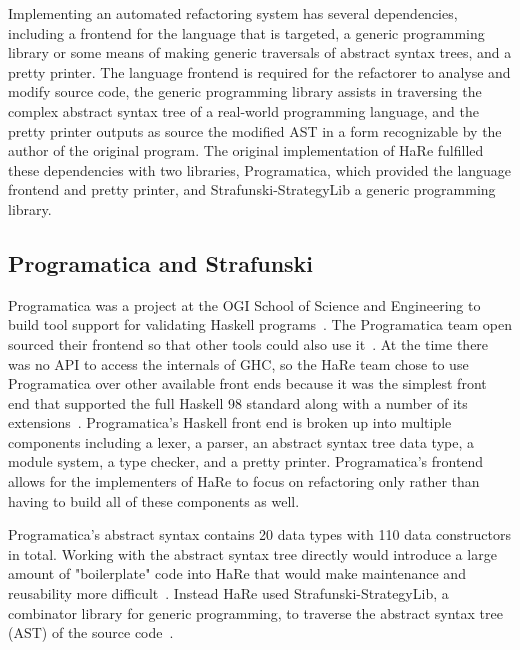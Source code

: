 Implementing an automated refactoring system has several dependencies, including a frontend for the language that is targeted, a generic programming library or some means of making generic traversals of abstract syntax trees, and a pretty printer. The language frontend is required for the refactorer to analyse and modify source code, the generic programming library assists in traversing the complex abstract syntax tree of a real-world programming language, and the pretty printer outputs as source the modified AST in a form recognizable by the author of the original program. The original implementation of HaRe fulfilled these dependencies with two libraries, Programatica, which provided the language frontend and pretty printer, and Strafunski-StrategyLib a generic programming library. 

\subsection{Programatica and Strafunski}\label{prog&Strafunski}

Programatica was a project at the OGI School of Science and Engineering to build tool support for validating Haskell programs~\citep{programaticaTools}. The Programatica team open sourced their frontend so that other tools could also use it~\citep{refacWebsite}. At the time there was no API to access the internals of GHC, so the HaRe team chose to use Programatica over other available front ends because it was the simplest front end that supported the full Haskell 98 standard along with a number of its extensions~\citep{huiqingThesis}. Programatica's Haskell front end is broken up into multiple components including a lexer, a parser, an abstract syntax tree data type, a module system, a type checker, and a pretty printer. Programatica's frontend allows for the implementers of HaRe to focus on refactoring only rather than having to build all of these components as well.

Programatica's abstract syntax contains 20 data types with 110 data constructors in total. Working with the abstract syntax tree directly would introduce a large amount of "boilerplate" code into HaRe that would make maintenance and reusability more difficult~\citep{huiqingThesis}. Instead HaRe used Strafunski-StrategyLib, a combinator library for generic programming, to traverse the abstract syntax tree (AST) of the source code~\citep{strafunski}. 

